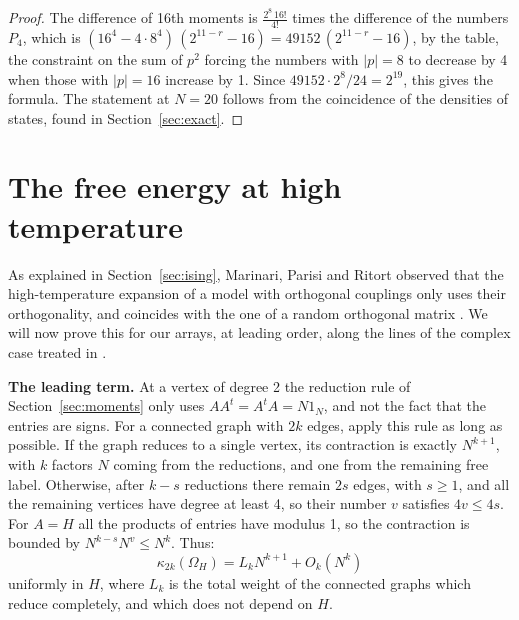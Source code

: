 \documentclass[11pt,a4paper]{article}
\theoremstyle{remark}
\begin{document}
\begin{proof}
The difference of 16th moments is $\frac{2^8\,16!}{4!}$ times the difference of the numbers $P_4$, which is $(16^4-4\cdot8^4)\,(2^{11-r}-16)=49152\,(2^{11-r}-16)$, by the table, the constraint on the sum of $p^2$ forcing the numbers with $|p|=8$ to decrease by 4 when those with $|p|=16$ increase by 1. Since $49152\cdot2^8/24=2^{19}$, this gives the formula. The statement at $N=20$ follows from the coincidence of the densities of states, found in Section~\ref{sec:exact}.
\end{proof}

\section{The free energy at high temperature}\label{sec:free}

As explained in Section~\ref{sec:ising}, Marinari, Parisi and Ritort observed that the high-temperature expansion of a model with orthogonal couplings only uses their orthogonality, and coincides with the one of a random orthogonal matrix \cite{mp1,mp2}. We will now prove this for our arrays, at leading order, along the lines of the complex case treated in \cite{cot}.

\medskip

\noindent\textbf{The leading term.}
At a vertex of degree 2 the reduction rule of Section~\ref{sec:moments} only uses $AA^t=A^tA=N1_N$, and not the fact that the entries are signs. For a connected graph with $2k$ edges, apply this rule as long as possible. If the graph reduces to a single vertex, its contraction is exactly $N^{k+1}$, with $k$ factors $N$ coming from the reductions, and one from the remaining free label. Otherwise, after $k-s$ reductions there remain $2s$ edges, with $s\geq1$, and all the remaining vertices have degree at least 4, so their number $v$ satisfies $4v\leq4s$. For $A=H$ all the products of entries have modulus 1, so the contraction is bounded by $N^{k-s}N^v\leq N^k$. Thus:
\[
 \kappa_{2k}(\Omega_H)=L_kN^{k+1}+O_k(N^k)
\]
uniformly in $H$, where $L_k$ is the total weight of the connected graphs which reduce completely, and which does not depend on $H$.

\medskip
\end{document}
